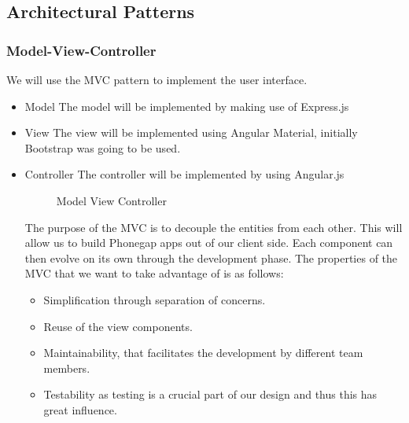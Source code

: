 \subsection{Architectural Patterns}
\subsubsection{Model-View-Controller}
We will use the MVC pattern to implement the user interface.
\begin{itemize}
	\item{Model}
	\newline
	The model will be implemented by making use of Express.js
	\item{View}
	\newline
	The view will be implemented using Angular Material, initially Bootstrap was going to be used.
	\item{Controller}
	\newline
	The controller will be implemented by using Angular.js
	\begin{figure}[H]
	    	\centering
	    	\caption{Model View Controller}
	    	\label{fig:Learning rate 0.1}
   	\end{figure}
	The purpose of the MVC is to decouple the entities from each other. This will allow us to build Phonegap apps out of our client side. Each component can then evolve on its own through the development phase. 
	The properties of the MVC that we want to take advantage of is as follows:
	\begin{itemize}
		\item Simplification through separation of concerns.
		\item Reuse of the view components.
		\item Maintainability, that facilitates the development by different team members.
		\item Testability as testing is a crucial part of our design and thus this has great influence.
	\end{itemize}
\end{itemize}